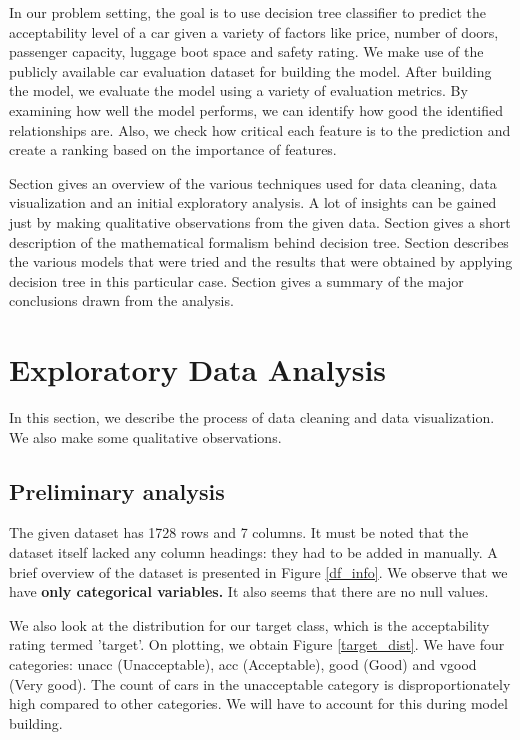 \documentclass[conference]{IEEEtran}
\newcommand{\rom}[1]{\uppercase\expandafter{\romannumeral #1\relax}}
\begin{document}
In our problem setting, the goal is to use decision tree classifier to predict the acceptability level of a car given a variety of factors like price, number of doors, passenger capacity, luggage boot space and safety rating. We make use of the publicly available car evaluation dataset for building the model. After building the model, we evaluate the model using a variety of evaluation metrics. By examining how well the model performs, we can identify how good the identified relationships are. Also, we check how critical each feature is to the prediction and create a ranking based on the importance of features.


Section \rom{2} gives an overview of the various techniques used for data cleaning, data visualization and an initial exploratory analysis. A lot of insights can be gained just by making qualitative observations from the given data. Section \rom{3} gives a short description of the mathematical formalism behind decision tree. Section \rom{4} describes the various models that were tried and the results that were obtained by applying decision tree in this particular case. Section \rom{5} gives a summary of the major conclusions drawn from the analysis.


\section{Exploratory Data Analysis}

In this section, we describe the process of data cleaning and data visualization. We also make some qualitative observations.

\subsection{Preliminary analysis}

The given dataset has 1728 rows and 7 columns. It must be noted that the dataset itself lacked any column headings: they had to be added in manually. A brief overview of the dataset is presented in Figure \ref{df_info}. We observe that we have \textbf{only categorical variables.} It also seems that there are no null values. 

We also look at the distribution for our target class, which is the acceptability rating termed 'target'. On plotting, we obtain Figure \ref{target_dist}. We have four categories: unacc (Unacceptable), acc (Acceptable), good (Good) and vgood (Very good). The count of cars in the unacceptable category is disproportionately high compared to other categories. We will have to account for this during model building.
\end{document}
